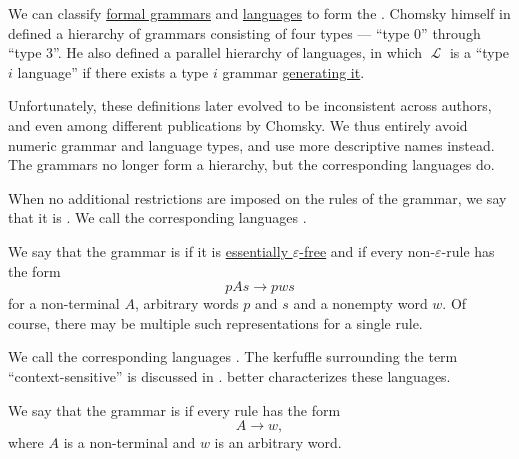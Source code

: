\begin{definition}\label{def:chomsky_hierarchy}
  We can classify \hyperref[def:formal_grammar]{formal grammars} and \hyperref[def:formal_language]{languages} to form the . Chomsky himself in \cite[def. 6]{Chomsky1959} defined a hierarchy of grammars consisting of four types --- \enquote{type 0} through \enquote{type 3}. He also defined a parallel hierarchy of languages, in which \( \mscrL \) is a \enquote{type \( i \) language} if there exists a type \( i \) grammar \hyperref[def:formal_grammar/language]{generating it}.

  Unfortunately, these definitions later evolved to be inconsistent across authors, and even among different publications by Chomsky. We thus entirely avoid numeric grammar and language types, and use more descriptive names instead. The grammars no longer form a hierarchy, but the corresponding languages do.

  \begin{thmenum}
     When no additional restrictions are imposed on the rules of the grammar, we say that it is . We call the corresponding languages .

     We say that the grammar is  if it is \hyperref[def:epsilon_free_grammar]{essentially \( \varepsilon \)-free} and if every non-\( \varepsilon \)-rule has the form
    \begin{equation*}
      p A s \to p w s
    \end{equation*}
    for a non-terminal \( A \), arbitrary words \( p \) and \( s \) and a nonempty word \( w \). Of course, there may be multiple such representations for a single rule.

    We call the corresponding languages . The kerfuffle surrounding the term \enquote{context-sensitive} is discussed in .  better characterizes these languages.

     We say that the grammar is  if every rule has the form
    \begin{equation*}
      A \to w,
    \end{equation*}
    where \( A \) is a non-terminal and \( w \) is an arbitrary word.


\end{thmenum}
\end{definition}
